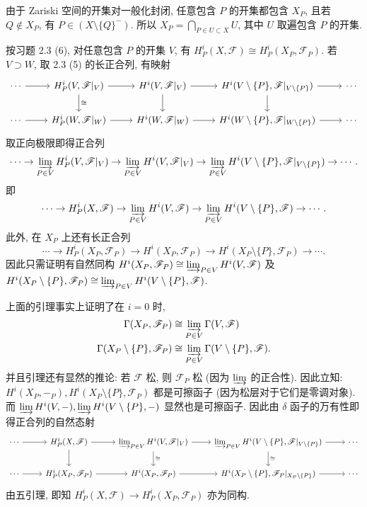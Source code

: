 \documentclass{article}
\theoremstyle{exercise}
\theoremstyle{plain}
\theoremstyle{remark}
\newenvironment{proofc}{\proof}{\endproof}
\def\sF{\mathscr{F}}
\begin{document}
\begin{proofc}[习题 2.5 的证明]
  由于 Zariski 空间的开集对一般化封闭, 任意包含 $P$ 的开集都包含 $X_P$,
  且若 $Q \notin X_P$, 有 $P \in (X \setminus \{Q\}^-)$.
  所以 $X_P = \bigcap_{P \in U \subset X} U$, 其中 $U$ 取遍包含 $P$ 的开集.

  按习题 2.3 (6), 对任意包含 $P$ 的开集 $V$, 有 $H_P^i(X, \sF) \cong H_P^i(X_P, \sF_P)$.
  若 $V \supset W$, 取 2.3 (5) 的长正合列, 有映射
  \[
    \begin{tikzcd}
      \cdots \ar[r] & H_P^i(V, \sF|_V) \ar[r] \ar[d, "\cong"]
      & H^i(V, \sF|_V) \ar[r] \ar[d] & H^i(V \setminus \{P\}, \sF|_{V \setminus \{P\}}) \ar[r] \ar[d] & \cdots\\
      \cdots \ar[r] & H_P^i(W, \sF|_W) \ar[r]
      & H^i(W, \sF|_W) \ar[r] & H^i(W \setminus \{P\}, \sF|_{W \setminus \{P\}}) \ar[r] & \cdots
    \end{tikzcd}
  \]
  取正向极限即得正合列
  \[
    \cdots \to \varinjlim_{P \in V} H_P^i(V, \sF|_V)
    \to \varinjlim_{P \in V} H^i(V, \sF|_V)
    \to \varinjlim_{P \in V} H^i(V \setminus \{P\}, \sF|_{V \setminus \{P\}})
    \to \cdots.
  \]
  即
  \[
    \cdots \to H_P^i(X, \sF)
    \to \varinjlim_{P \in V} H^i(V, \sF)
    \to \varinjlim_{P \in V} H^i(V \setminus \{P\}, \sF)
    \to \cdots.
  \]
  此外, 在 $X_P$ 上还有长正合列
  \[
    \cdots \to H_P^i(X_P, \sF_P) \to H^i(X_P, \sF_P) \to H^i(X_P \setminus \{P\}, \sF_P) \to \cdots.
  \]
  因此只需证明有自然同构 $H^i(X_P, \sF_P) \cong \varinjlim_{P \in V} H^i(V, \sF)$
  及 $H^i(X_P \setminus \{P\}, \sF_P) \cong \varinjlim_{P \in V} H^i(V \setminus \{P\}, \sF)$.

  上面的引理事实上证明了在 $i = 0$ 时,
  \begin{align*}
    \Gamma(X_P, \sF_P) &\cong \varinjlim_{P \in V} \Gamma(V, \sF) \\
    \Gamma(X_P \setminus \{P\}, \sF_P) &\cong \varinjlim_{P \in V} \Gamma(V \setminus \{P\}, \sF).
  \end{align*}
  并且引理还有显然的推论: 若 $\sF$ 松, 则 $\sF_P$ 松 (因为 $\varinjlim$ 的正合性).
  因此立知: $H^i(X_P, -_P), H^i(X_P \setminus \{P\}, \sF_P)$ 都是可擦函子 (因为松层对于它们是零调对象).
  而 $\varinjlim H^i(V, -), \varinjlim H^i(V \setminus \{P\}, -)$ 显然也是可擦函子.
  因此由 $\delta$ 函子的万有性即得正合列的自然态射
  \[
    \begin{tikzcd}
      \cdots \ar[r] & H_P^i(X, \sF) \ar[r] \ar[d]
      & \varinjlim_{P \in V} H^i(V, \sF|_V) \ar[r] \ar[d, "\cong"]
      & \varinjlim_{P \in V} H^i(V \setminus \{P\}, \sF|_{V \setminus \{P\}}) \ar[r] \ar[d, "\cong"] & \cdots\\
      \cdots \ar[r] & H_P^i(X_P, \sF_P) \ar[r]
      & H^i(X_P, \sF_P) \ar[r] & H^i(X_P \setminus \{P\}, \sF_P|_{X_P \setminus \{P\}}) \ar[r] & \cdots
    \end{tikzcd}
  \]
  由五引理, 即知 $H_P^i(X, \sF) \to H_P^i(X_P, \sF_P)$ 亦为同构.
\end{proofc}
\end{document}
